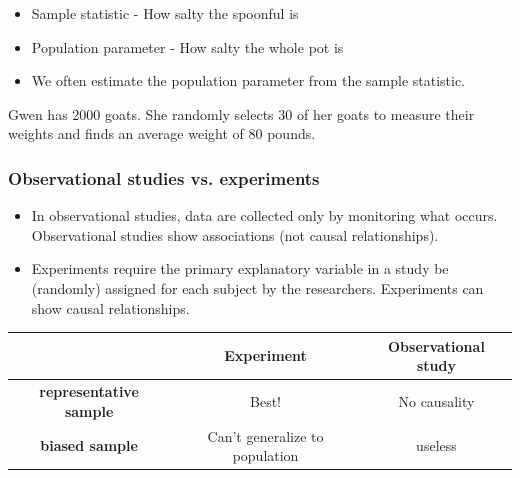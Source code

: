 \begin{frame}
\begin{itemize}
\item Sample statistic - How salty the spoonful is
\item Population parameter - How salty the whole pot is
\item We often estimate the population parameter from the sample statistic.
\end{itemize}
\pause
Gwen has 2000 goats. She randomly selects 30 of her goats to measure their weights and finds an average weight of 80 pounds.
\pause {}
\pause {}
\pause {}
\pause {}
\end{frame}





\begin{frame}
\frametitle{Observational studies vs. experiments}
\pause
\begin{itemize}
\item In observational studies, data are collected only by monitoring what occurs. Observational studies show associations (not causal relationships).
\pause
\item Experiments require the primary explanatory variable in a study be (randomly) assigned for each subject by the researchers. Experiments can show causal relationships.
\end{itemize}


\pause
\begin{center} \footnotesize
\begin{tabular}{|c|c|c|} \hline
                      & \bf Experiment &  \bf Observational study \\ \hline
\bf representative sample & Best!      & No causality \\\hline
\bf biased sample         & Can't generalize to population & useless \\ \hline
\end{tabular}
\end{center}
\end{frame}


